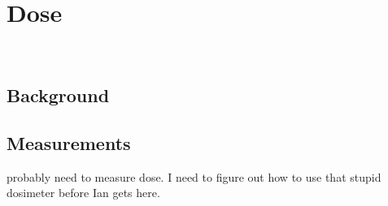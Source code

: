 \chapter{Dose}
~\cite{Bauhs2008}
~\cite{Bankier2012}
\section{Background}
\section{Measurements}

probably need to measure dose. I need to figure out how to use that stupid dosimeter before Ian gets here.